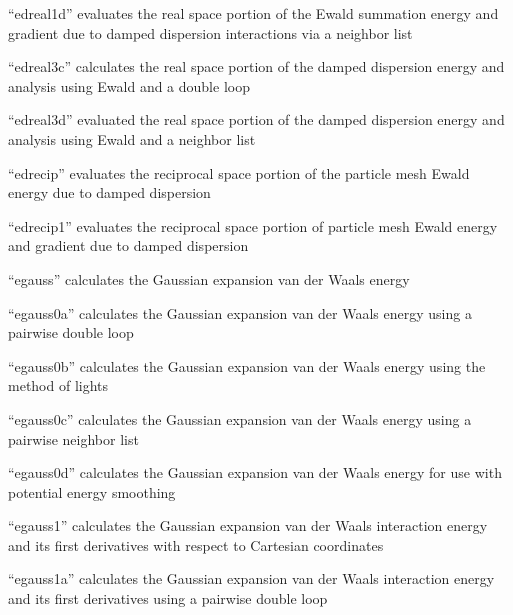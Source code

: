 \documentclass[letterpaper,11pt,english]{sphinxmanual}
\begin{document}
“edreal1d” evaluates the real space portion of the Ewald
summation energy and gradient due to damped dispersion
interactions via a neighbor list


“edreal3c” calculates the real space portion of the damped
dispersion energy and analysis using Ewald and a double loop


“edreal3d” evaluated the real space portion of the damped
dispersion energy and analysis using Ewald and a neighbor list


“edrecip” evaluates the reciprocal space portion of the particle
mesh Ewald energy due to damped dispersion


“edrecip1” evaluates the reciprocal space portion of particle
mesh Ewald energy and gradient due to damped dispersion


“egauss” calculates the Gaussian expansion van der Waals energy


“egauss0a” calculates the Gaussian expansion van der Waals
energy using a pairwise double loop


“egauss0b” calculates the Gaussian expansion van der Waals energy
using the method of lights


“egauss0c” calculates the Gaussian expansion van der Waals
energy using a pairwise neighbor list


“egauss0d” calculates the Gaussian expansion van der Waals
energy for use with potential energy smoothing


“egauss1” calculates the Gaussian expansion van der Waals
interaction energy and its first derivatives with respect
to Cartesian coordinates


“egauss1a” calculates the Gaussian expansion van der Waals
interaction energy and its first derivatives using a pairwise
double loop
\end{document}

